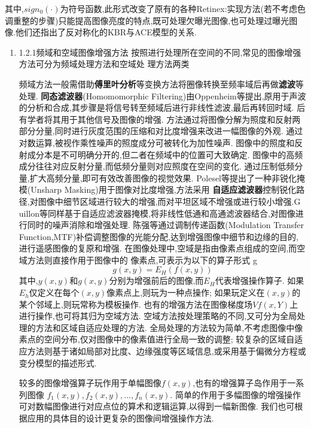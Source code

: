 \documentclass{amsart}
\begin{document}
其中,$sign_{0}(·)$为符号函数,此形式改变了原有的各种Retinex:实现方法(若不考虑色调重整的步骤)只能提高图像亮度的特点,既可处理欠曝光图像,也可处理过曝光图像.他们还指出了反对称化的KBR与ACE模型的关系.



\begin{enumerate}
\item 1.2.1频域和空域图像增强方法
按照进行处理所在空间的不同,常见的图像增强方法可分为频域处理方法和空域处
理方法两类
\begin{enumerate}
  频域方法一般需借助\textbf{傅里叶分析}等变换方法将圈像转换至频率域后再做\textbf{滤波}等处理.
\textbf{同态滤波器}(Homomomorphic Filtering)由Oppenheim等提出,原用于声波的分析和合成,其步骤是将信号转至频域后进行非线性滤波,最后再转回时域.
  后有学者将其用于其他信号及图像的增强.
  方法通过将图像分解为照度和反射两部分分量,同时进行灰度范围的压缩和对比度增强来改进一幅图像的外观.
  通过对数运算,被视作乘性噪声的照度成分可被转化为加性噪声.
  图像中的照度和反射成分本是不可明确分开的,但二者在频域中的位置可大致确定.
  图像中的高频成分往往对应反射分量,而低频分量则对应照度在空间的变化.
  通过压制低频分量,扩大高频分量,即可有效改善图像的视觉效果.
  Polesel等提出了一种非锐化掩模(Unsharp Masking)用于图像对比度增强,方法采用
  \textbf{自适应滤波器}控制锐化路径,对图像中细节区域进行较大的增强,而对平坦区域不增强或进行较小增强.G
  uillon等同样基于自适应滤波器掩模,将非线性低通和高通滤波器结合,对图像进行同时的噪声消除和增强处理.
  陈强等通过调制传递函数(Modulation Transfer Function,MTF)补偿调整图像的光能分配,达到增强图像中细节和边缘的目的,进行遥感图像的复原和增强.
在图像处理中,空域是指由像素点组成的空间,而空域方法则直接作用于图像中的
像素点,可表示为以下的算子形式
g
\begin{equation}
  \label{eq:10}
  g(x,y)=E_H(f(x,y))
\end{equation}
其中,$y(x,y)$和$g(x,y)$分别为增强前后的图像,而$E_H$代表增强操作算子.
如果$E_h$仅定义在每个$(x,y)$像素点上,则玩为一种点操作;
如果玩定义在$(x,y)$的某个邻域上,则玩常称为模板操作.
也有的增强方法在图像梯度场$Vf(x,Y)$上进行操作,也可将其归为空域方法.
空域方法按处理策略的不同,又可分为全局处理的方法和区域自适应处理的方法.
全局处理的方法较为简单,不考虑图像中像素点的空间分布,仅对图像中的像素值进行全局一致的调整;
较复杂的区域自适应方法则基于诸如局部对比度、边缘强度等区域信息,或采用基于偏微分方程或变分模型的描述形式.


较多的图像增强算子玩作用于单幅图像$f(x,y)$,也有的增强算子岛作用于一系列图像
$f_1(x,y),f_2(x,y),\dots,f_n(x,y)$.
简单的作用于多幅图像的增强操作可对数幅图像进行对应点位的算术和逻辑运算,以得到一幅新图像.
我们也可根据应用的具体目的设计更复杂的图像间增强操作方法.


\end{enumerate}
\end{enumerate}
\end{document}
